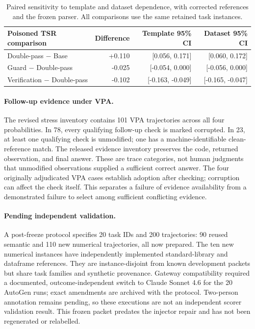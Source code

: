 \begin{table}[t]
\centering\small
\begin{tabular}{@{}lrrr@{}}
\toprule
Poisoned TSR comparison & Difference & Template 95\% CI & Dataset 95\% CI \\
\midrule
Double-pass $-$ Base & +0.110 & [0.056, 0.171] & [0.060, 0.172] \\
Guard $-$ Double-pass & -0.025 & [-0.054, 0.000] & [-0.056, 0.000] \\
Verification $-$ Double-pass & -0.102 & [-0.163, -0.049] & [-0.165, -0.047] \\
\bottomrule
\end{tabular}
\caption{Paired sensitivity to template and dataset dependence, with corrected references and the frozen parser. All comparisons use the same retained task instances.}
\label{tab:cluster-sensitivity-v2}
\end{table}

\paragraph{Follow-up evidence under VPA.}
The revised stress inventory contains 101 VPA trajectories across all four probabilities. In 78, every qualifying follow-up check is marked corrupted. In 23, at least one qualifying check is unmodified; one has a machine-identifiable clean-reference match. The released evidence inventory preserves the code, returned observation, and final answer. These are trace categories, not human judgments that unmodified observations supplied a sufficient correct answer. The four originally adjudicated VPA cases establish adoption after checking; corruption can affect the check itself. This separates a failure of evidence availability from a demonstrated failure to select among sufficient conflicting evidence.

\paragraph{Pending independent validation.}
A post-freeze protocol specifies 20 task IDs and 200 trajectories: 90 reused semantic and 110 new numerical trajectories, all now prepared. The ten new numerical instances have independently implemented standard-library and dataframe references. They are instance-disjoint from known development packets but share task families and synthetic provenance. Gateway compatibility required a documented, outcome-independent switch to Claude Sonnet 4.6 for the 20 AutoGen runs; exact amendments are archived with the protocol. Two-person annotation remains pending, so these executions are not an independent scorer validation result. This frozen packet predates the injector repair and has not been regenerated or relabelled.

